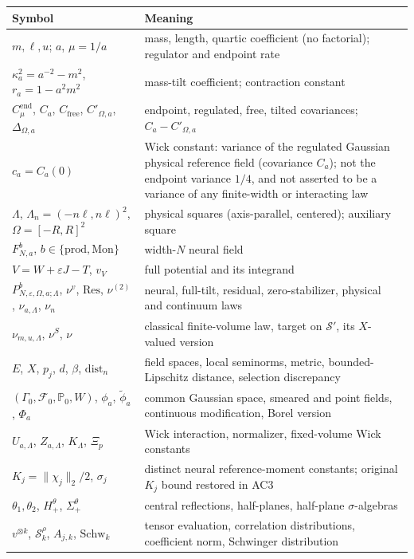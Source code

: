 \documentclass[11pt]{article}
\theoremstyle{plain}
\theoremstyle{definition}
\theoremstyle{remark}
\newcommand{\PP}{\mathbb{P}}
\newcommand{\cF}{\mathcal{F}}
\newcommand{\cS}{\mathcal{S}}
\newcommand{\Cend}{C^{\mathrm{end}}_{\mu}}
\newcommand{\Cfree}{C_{\mathrm{free}}}
\newcommand{\Res}{\mathrm{Res}}
\newcommand{\dist}{\mathrm{dist}}
\newcommand{\Schw}{\mathrm{Schw}}
\newcommand{\bprod}{\mathrm{prod}}
\newcommand{\bMon}{\mathrm{Mon}}
\begin{document}
{\small
\begin{longtable}{@{}p{}p{}@{}}
\toprule
Symbol & Meaning\\
\midrule
$m,\ell,u$; $a$, $\mu=1/a$ & mass, length, quartic coefficient (no factorial); regulator and endpoint rate\\
$\kappa_a^{2}=a^{-2}-m^{2}$, $r_a=1-a^{2}m^{2}$ & mass-tilt coefficient; contraction constant\\
$\Cend$, $C_a$, $\Cfree$, $C'_{\Omega,a}$, $\Delta_{\Omega,a}$ & endpoint, regulated, free, tilted covariances; $C_a-C'_{\Omega,a}$\\
$c_a=C_a(0)$ & Wick constant: variance of the regulated Gaussian physical reference field (covariance $C_a$); not the endpoint variance $1/4$, and not asserted to be a variance of any finite-width or interacting law\\
$\Lambda$, $\Lambda_n=(-n\ell,n\ell)^{2}$, $\Omega=[-R,R]^{2}$ & physical squares (axis-parallel, centered); auxiliary square\\
$F^{b}_{N,a}$, $b\in\{\bprod,\bMon\}$ & width-$N$ neural field\\
$V=W+\varepsilon J-T$, $v_V$ & full potential and its integrand\\
$P^{b}_{N,\varepsilon,\Omega,a;\Lambda}$, $\nu^{v}$, $\Res$, $\nu^{(2)}$, $\nu_{a,\Lambda}$, $\nu_n$ & neural, full-tilt, residual, zero-stabilizer, physical and continuum laws\\
$\nu_{m,u,\Lambda}$, $\nu^{S}$, $\nu$ & classical finite-volume law, target on $\cS'$, its $X$-valued version\\
$E$, $X$, $p_j$, $d$, $\beta$, $\dist_n$ & field spaces, local seminorms, metric, bounded-Lipschitz distance, selection discrepancy\\
$(\Gamma_0,\cF_0,\PP_0,W)$, $\phi_a$, $\tilde\phi_a$, $\Phi_a$ & common Gaussian space, smeared and point fields, continuous modification, Borel version\\
$U_{a,\Lambda}$, $Z_{a,\Lambda}$, $K_\Lambda$, $\Xi_p$ & Wick interaction, normalizer, fixed-volume Wick constants\\
$K_j=\|\chi_j\|_2/2$, $\sigma_j$ & distinct neural reference-moment constants; original $K_j$ bound restored in AC3\\
$\theta_1,\theta_2$, $H^{\theta}_{+}$, $\Sigma^{\theta}_{+}$ & central reflections, half-planes, half-plane $\sigma$-algebras\\
$v^{\otimes k}$, $\cS^{\rho}_{k}$, $A_{j,k}$, $\Schw_k$ & tensor evaluation, correlation distributions, coefficient norm, Schwinger distribution\\
\bottomrule
\end{longtable}}
\end{document}
